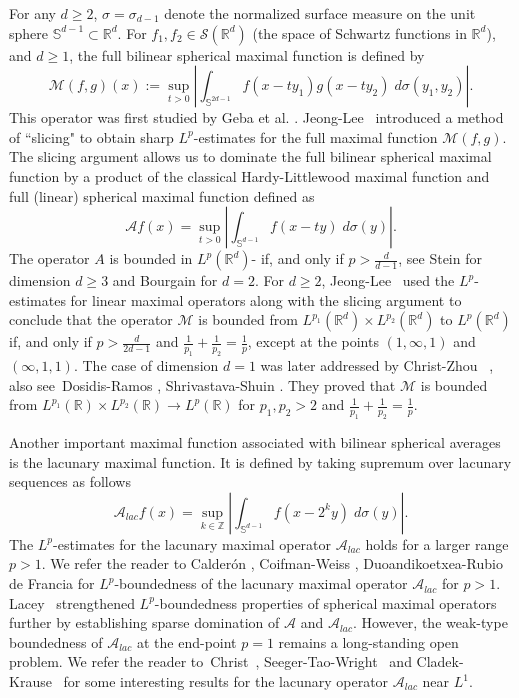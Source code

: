 \documentclass[a4paper,reqno]{amsart}
\theoremstyle{definition}
\theoremstyle{remark}
\numberwithin{equation}{section}
\newcommand{\R}{{\mathbb {R}}}
\newcommand{\Z}{{\mathbb Z}}
\begin{document}
	For any $d\geq2$, $\sigma=\sigma_{d-1}$ denote the normalized surface measure on the unit sphere $\mathbb S^{d-1}\subset \R^d$. For $f_1,f_2\in\mathscr{S}(\R^{d})$ (the space of Schwartz functions in $\R^d$), and $d\geq 1$, the full bilinear spherical maximal function is defined by 
	$$\mathcal{M}(f,g)(x):=\sup_{t>0}\left|\int_{\mathbb S^{2d-1}}f(x-ty_1)g(x-ty_2)\;d\sigma(y_1,y_2)\right|.$$
	This operator was first studied by Geba et al. \cite{GGIPS}. Jeong-Lee~\cite{JeongLee} introduced a method of ``slicing" to obtain sharp $L^p$-estimates for the full maximal function $\mathcal{M}(f,g)$. The slicing argument allows us to dominate the full bilinear spherical maximal function by a product of the classical Hardy-Littlewood maximal function and full (linear) spherical maximal function defined as
	\[\mathcal Af(x)=\sup_{t>0}\left|\int_{\mathbb S^{d-1}}f(x-ty)\;d\sigma(y)\right|.\]
	The operator $A$ is bounded in $L^p(\R^d)$- if, and only if $p>\frac{d}{d-1}$, see Stein \cite{MaximalFunctionsISphericalMeans} for dimension $d\geq3$ and Bourgain \cite{BourgainCircular} for $d=2$. For $d\geq 2$, Jeong-Lee~\cite{JeongLee} used the $L^p$-estimates for linear maximal operators along with the slicing argument to conclude that the operator $\mathcal{M}$ is bounded from $L^{p_1}(\R^d)\times L^{p_2}(\R^d)$ to $L^{p}(\R^d)$ if, and only if $p>\frac{d}{2d-1}$ and $\frac{1}{p_1}+\frac{1}{p_2}=\frac{1}{p}$, except at the points $(1,\infty,1)$ and $(\infty,1,1)$.  The case of dimension $d=1$ was later addressed by Christ-Zhou~ \cite{ChristZhou}, also see~Dosidis-Ramos \cite{DosidisRamos}, Shrivastava-Shuin \cite{ShrivastavaShuin}. They proved that $\mathcal{M}$ is bounded from $L^{p_1}(\R)\times L^{p_2}(\R)\to L^p(\R)$ for $p_1,p_2>2$ and $\frac{1}{p_1}+\frac{1}{p_2}=\frac{1}{p}$. 
	
	Another important maximal function associated with bilinear spherical averages is the lacunary maximal function. It is defined by taking supremum over lacunary sequences as follows  
	\[\mathcal A_{lac}f(x)=\sup_{k\in \Z}\left|\int_{\mathbb S^{d-1}}f(x-2^ky)\;d\sigma(y)\right|.\]
	The $L^p$-estimates for the lacunary maximal operator $\mathcal{A}_{lac}$ holds for a larger range $p>1$.  We refer the reader to  Calder\'{o}n \cite{CalderonLacunarySphericalMeans}, Coifman-Weiss \cite{CoifmanWeissBookReview}, Duoandikoetxea-Rubio de Francia \cite{DR} for $L^p$-boundedness of the lacunary maximal operator $\mathcal{A}_{lac}$ for $p>1$. Lacey~\cite{SparseBoundsForSphericalMaximalFunction} strengthened $L^p$-boundedness properties of spherical maximal operators further by establishing sparse domination of $\mathcal {A}$ and $\mathcal A_{lac}$. 
	However, the weak-type boundedness of  $\mathcal{A}_{lac}$ at the end-point $p=1$ remains a long-standing open problem. We refer the reader to~Christ~\cite{Christ1985}, Seeger-Tao-Wright~\cite{EndpointMappingPropertiesOfSphericalMaximalOperators} and Cladek-Krause~\cite{CladekKrause} for some interesting results for the lacunary operator $\mathcal{A}_{lac}$ near $L^1$. 
	
\end{document}
